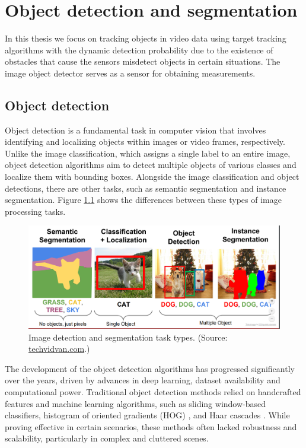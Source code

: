 \chapter{Object detection and segmentation}
In this thesis we focus on tracking objects in video data using target tracking algorithms with the dynamic detection probability due to the existence of obstacles that cause the sensors misdetect objects in certain situations. The image object detector serves as a sensor for obtaining measurements.


\section{Object detection}
Object detection is a fundamental task in computer vision that involves identifying and localizing objects
within images or video frames, respectively. Unlike the image classification, which assigns a single label to an entire
image, object
detection algorithms aim to detect multiple objects of various classes and localize them with bounding boxes.
Alongside the image classification and object detections, there are other tasks, such as semantic segmentation and
instance segmentation. Figure \ref{fig:seg_type} shows the differences between these types of image processing tasks.

\begin{figure}
  \centering
  \includegraphics[width=\linewidth]{text/chapter_03/imgs/segmentation-types}
  \caption{Image detection and segmentation task types. (Source: \href{https://techvidvan.com/tutorials/image-segmentation-machine-learning/}{techvidvan.com}.)}
  \label{fig:seg_type}
\end{figure}

The development of the object detection algorithms has progressed significantly over the years, driven by advances in deep
learning, dataset availability and computational power. Traditional object detection methods relied on handcrafted
features and machine learning algorithms, such as sliding window-based classifiers, histogram of oriented gradients (HOG) \cite{HoOGDalal2005}, and Haar cascades \cite{HaarCascadesLi2016}. While proving effective in certain scenarios, these methods often lacked robustness and scalability, particularly in complex and cluttered scenes.

